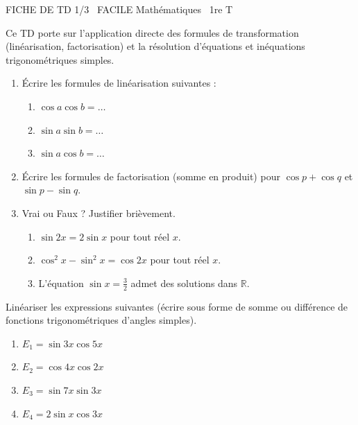 \documentclass[11pt]{article}
\begin{document}
\begin{tcolorbox}[enhanced,colback=popink,colframe=popink,arc=10pt,boxrule=0pt,left=12pt,right=12pt,top=9pt,bottom=9pt]
{\color{white}\popxbold\small FICHE DE TD 1/3 \textbullet\ FACILE \hfill Mathématiques \textbullet\ 1re T\par}
\end{tcolorbox}
\vspace{4pt}
Ce TD porte sur l'application directe des formules de transformation (linéarisation, factorisation) et la résolution d'équations et inéquations trigonométriques simples.

\begin{exercice}
\begin{enumerate}
    \item Écrire les formules de linéarisation suivantes :
    \begin{enumerate}
        \item $\cos a \cos b = \dots$
        \item $\sin a \sin b = \dots$
        \item $\sin a \cos b = \dots$
    \end{enumerate}
    \item Écrire les formules de factorisation (somme en produit) pour $\cos p + \cos q$ et $\sin p - \sin q$.
    \item Vrai ou Faux ? Justifier brièvement.
    \begin{enumerate}
        \item $\sin 2x = 2\sin x$ pour tout réel $x$.
        \item $\cos^2 x - \sin^2 x = \cos 2x$ pour tout réel $x$.
        \item L'équation $\sin x = \frac{3}{2}$ admet des solutions dans $\mathbb{R}$.
    \end{enumerate}
\end{enumerate}
\end{exercice}

\begin{exercice}
Linéariser les expressions suivantes (écrire sous forme de somme ou différence de fonctions trigonométriques d'angles simples).
\begin{enumerate}
    \item $E_1 = \sin 3x \cos 5x$
    \item $E_2 = \cos 4x \cos 2x$
    \item $E_3 = \sin 7x \sin 3x$
    \item $E_4 = 2 \sin x \cos 3x$
\end{enumerate}
\end{exercice}
\end{document}

